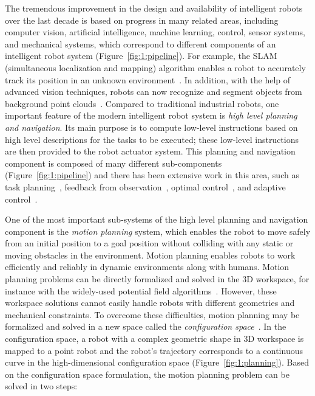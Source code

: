 The tremendous improvement in the design and availability of intelligent robots over the last decade is based on progress in many related areas, including computer vision, artificial intelligence, machine learning, control, sensor systems, and mechanical systems, which correspond to different components of an intelligent robot system (Figure~\ref{fig:1:pipeline}). For example, the SLAM (simultaneous localization and mapping) algorithm enables a robot to accurately track its position in an unknown environment~\cite{PR:2005}. In addition, with the help of advanced vision techniques, robots can now recognize and segment objects from background point clouds~\cite{Rusu:2009:IROS}. 
Compared to traditional industrial robots, one important feature of the modern intelligent robot system is \emph{high level planning and navigation}. Its main purpose is to compute low-level instructions based on high level descriptions for the tasks to be executed; these low-level instructions are then provided to the robot actuator system.
This planning and navigation component is composed of many different sub-components (Figure~\ref{fig:1:pipeline}) and there has been extensive work in this area, such as task planning~\cite{LPT:TPP:1989}, feedback from observation~\cite{KLP:2012:UPE,KLP:2011:NOW}, optimal control~\cite{Stengel:1994:OC}, and adaptive control~\cite{Astrom:1994:AC}.


One of the most important sub-systems of the high level planning and navigation component is the \emph{motion planning} system, which enables the robot to move safely from an initial position to a goal position without colliding with any static or moving obstacles in the environment. Motion planning enables robots to work efficiently and reliably in dynamic environments along with humans. Motion planning problems can be directly formalized and solved in the 3D workspace, for instance with the widely-used potential field algorithms~\cite{Khatib:IJRR:1986}. However, these workspace solutions cannot easily handle robots with different geometries and mechanical constraints. To overcome these difficulties, 
motion planning may be formalized and solved in a new space called the \emph{configuration space}~\cite{Lozano-Perez:1979:APC,LPT:APM:1981,LPT:SpatialPlanning:1983}. In the configuration space, a robot with a complex geometric shape in 3D workspace is mapped to a point robot and the robot's trajectory corresponds to a continuous curve in the high-dimensional configuration space (Figure~\ref{fig:1:planning}). Based on the configuration space formulation, the motion planning problem can be solved in two steps:

